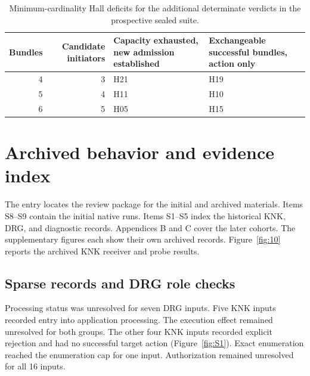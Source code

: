 \begin{table}[tbp]

\centering\small

\caption{Minimum-cardinality Hall deficits for the additional determinate verdicts in the prospective sealed suite.}\label{tab:9}

\begin{tabularx}{\textwidth}{@{}rrXX@{}}

\toprule

\textbf{Bundles} & \textbf{Candidate initiators} & \textbf{Capacity exhausted, new admission established} & \textbf{Exchangeable successful bundles, action only} \\

\midrule

4 & 3 & H21 & H19 \\

5 & 4 & H11 & H10 \\

6 & 5 & H05 & H15 \\

\bottomrule

\end{tabularx}

\end{table}

\section{Archived behavior and evidence index}\label{archived-behavior-and-evidence-index}

The  entry locates the review package for the initial and archived materials. Items S8--S9 contain the initial native runs. Items S1--S5 index the historical KNK, DRG, and diagnostic records. Appendices B and C cover the later cohorts. The supplementary figures each show their own archived records. Figure~\ref{fig:10} reports the archived KNK receiver and probe results.

\subsection{Sparse records and DRG role checks}\label{sparse-records-and-drg-role-checks}

Processing status was unresolved for seven DRG inputs. Five KNK inputs recorded entry into application processing. The execution effect remained unresolved for both groups. The other four KNK inputs recorded explicit rejection and had no successful target action (Figure~\ref{fig:S1}). Exact enumeration reached the enumeration cap for one input. Authorization remained unresolved for all 16 inputs.

